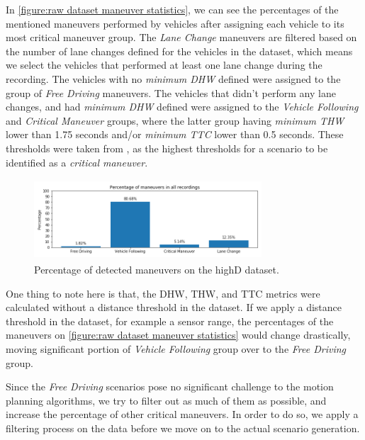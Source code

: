 \documentclass[conference]{IEEEtran}
\begin{document}
In \autoref{figure:raw dataset maneuver statistics}, we can see the percentages of the mentioned maneuvers performed by vehicles after assigning each vehicle to its most critical maneuver group. The \textit{Lane Change} maneuvers are filtered based on the number of lane changes defined for the vehicles in the dataset, which means we select the vehicles that performed at least one lane change during the recording. The vehicles with no \textit{minimum DHW} defined were assigned to the group of \textit{Free Driving} maneuvers. The vehicles that didn't perform any lane changes, and had \textit{minimum DHW} defined were assigned to the \textit{Vehicle Following} and \textit{Critical Maneuver} groups, where the latter group having \textit{minimum THW} lower than 1.75 seconds and/or \textit{minimum TTC} lower than 0.5 seconds. These thresholds were taken from \cite{benmimoun2011incident}, as the highest thresholds for a scenario to be identified as a \textit{critical maneuver}.\\ 

\begin{figure}[!h]
  \begin{center}
  	\includegraphics[width=8.5cm,height=3cm]{./images/raw_maneuvers}
  \end{center}
  \caption{Percentage of detected maneuvers on the highD dataset.}
  \label{figure:raw dataset maneuver statistics}
\end{figure}

One thing to note here is that, the DHW, THW, and TTC metrics were calculated without a distance threshold in the dataset. If we apply a distance threshold in the dataset, for example a sensor range, the percentages of the maneuvers on \autoref{figure:raw dataset maneuver statistics} would change drastically, moving significant portion of \textit{Vehicle Following} group over to the \textit{Free Driving} group. 

Since the \textit{Free Driving} scenarios pose no significant challenge to the motion planning algorithms, we try to filter out as much of them as possible, and increase the percentage of other critical maneuvers. In order to do so, we apply a filtering process on the data before we move on to the actual scenario generation.\\
\end{document}
